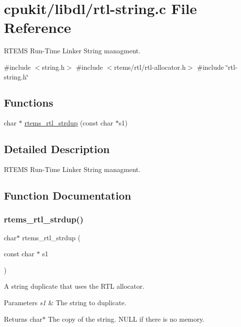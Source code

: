 \hypertarget{rtl-string_8c}{}\section{cpukit/libdl/rtl-\/string.c File Reference}
\label{rtl-string_8c}


R\+T\+E\+MS Run-\/\+Time Linker String managment.  


{\ttfamily \#include $<$string.\+h$>$}\newline
{\ttfamily \#include $<$rtems/rtl/rtl-\/allocator.\+h$>$}\newline
{\ttfamily \#include \char`\"{}rtl-\/string.\+h\char`\"{}}\newline
\subsection*{Functions}
\begin{DoxyCompactItemize}
\item 
char $\ast$ \mbox{\hyperlink{rtl-string_8c_aaea62293930444541e3c8cd91978c9e5}{rtems\+\_\+rtl\+\_\+strdup}} (const char $\ast$s1)
\end{DoxyCompactItemize}


\subsection{Detailed Description}
R\+T\+E\+MS Run-\/\+Time Linker String managment. 



\subsection{Function Documentation}
\mbox{\label{rtl-string_8c_aaea62293930444541e3c8cd91978c9e5}} 
\subsubsection{\texorpdfstring{rtems\_rtl\_strdup()}{rtems\_rtl\_strdup()}}
{\footnotesize\ttfamily char$\ast$ rtems\+\_\+rtl\+\_\+strdup (\begin{DoxyParamCaption}\item[{const char $\ast$}]{s1 }\end{DoxyParamCaption})}

A string duplicate that uses the R\+TL allocator.


\begin{DoxyParams}{Parameters}
{\em s1} & The string to duplicate. \\
\hline
\end{DoxyParams}
\begin{DoxyReturn}{Returns}
char$\ast$ The copy of the string. N\+U\+LL if there is no memory. 
\end{DoxyReturn}

